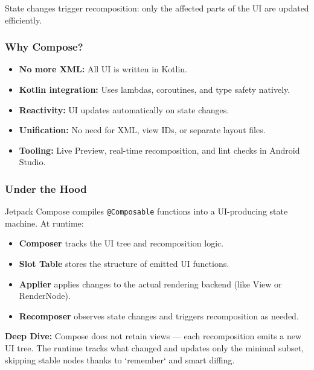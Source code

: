 \documentclass[a4paper,12pt]{article}
\begin{document}
State changes trigger recomposition: only the affected parts of the UI are updated efficiently.

\subsubsection{Why Compose?}
\begin{itemize}
  \item \textbf{No more XML:} All UI is written in Kotlin.
  \item \textbf{Kotlin integration:} Uses lambdas, coroutines, and type safety natively.
  \item \textbf{Reactivity:} UI updates automatically on state changes.
  \item \textbf{Unification:} No need for XML, view IDs, or separate layout files.
  \item \textbf{Tooling:} Live Preview, real-time recomposition, and lint checks in Android Studio.
\end{itemize}

\subsubsection{Under the Hood}
Jetpack Compose compiles \texttt{@Composable} functions into a UI-producing state machine. At runtime:

\begin{itemize}
  \item \textbf{Composer} tracks the UI tree and recomposition logic.
  \item \textbf{Slot Table} stores the structure of emitted UI functions.
  \item \textbf{Applier} applies changes to the actual rendering backend (like View or RenderNode).
  \item \textbf{Recomposer} observes state changes and triggers recomposition as needed.
\end{itemize}

\textbf{Deep Dive:} Compose does not retain views — each recomposition emits a new UI tree. The runtime tracks what changed and updates only the minimal subset, skipping stable nodes thanks to `remember` and smart diffing.
\end{document}
